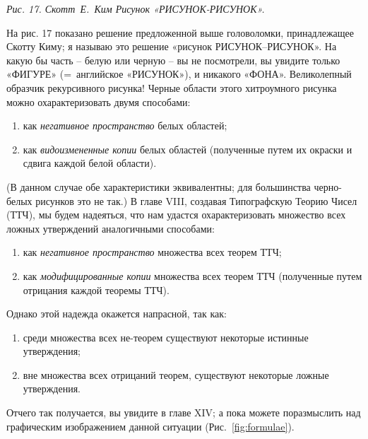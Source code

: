 \documentclass[../main.tex]{subfiles}
\begin{document}
\emph{Рис. 17. Скотт~Е.~Ким Рисунок «РИСУНОК-РИСУНОК».}

На рис. 17 показано решение предложенной выше головоломки, принадлежащее Скотту Киму; я называю это решение «рисунок РИСУНОК--РИСУНОК». На какую бы часть \--- белую или черную \--- вы не посмотрели, вы увидите только «ФИГУРЕ» (=~английское «РИСУНОК»), и никакого «ФОНА». Великолепный образчик рекурсивного рисунка! Черные области этого хитроумного рисунка можно охарактеризовать двумя способами:
%
\begin{enumerate}[label=(\arabic*), noitemsep, topsep=6pt, left=\parindent]
    \item как \emph{негативное пространство} белых областей;
    \item как \emph{видоизмененные копии} белых областей (полученные путем их окраски и сдвига каждой белой области).
\end{enumerate}
%
(В данном случае обе характеристики эквивалентны; для большинства черно-белых рисунков это не так.)
В главе VIII, создавая Типографскую Теорию Чисел (ТТЧ), мы будем надеяться, что нам удастся охарактеризовать множество всех ложных утверждений аналогичными способами:
%
\begin{enumerate}[label=(\arabic*), noitemsep, topsep=6pt, left=\parindent]
    \item как \emph{негативное пространство} множества всех теорем ТТЧ;
    \item как \emph{модифицированные копии} множества всех теорем ТТЧ (полученные путем отрицания каждой теоремы ТТЧ).
\end{enumerate}
%
Однако этой надежда окажется напрасной, так как:
%
\begin{enumerate}[label=(\arabic*), noitemsep, topsep=6pt, left=\parindent]
    \item среди множества всех не-теорем существуют некоторые истинные утверждения;
    \item вне множества всех отрицаний теорем, существуют некоторые ложные утверждения.
\end{enumerate}

Отчего так получается, вы увидите в главе XIV; а пока можете поразмыслить над графическим изображением данной ситуации (Рис.~\ref{fig:formulae}).
\end{document}
